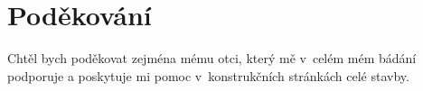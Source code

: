 \vfill

\vglue 14cm

\section*{Poděkování}

\begin{spacing}{1.3}
Chtěl bych poděkovat zejména mému otci, který mě v~celém mém bádání podporuje a poskytuje mi pomoc v~konstrukčních stránkách celé stavby. 
\end{spacing}
